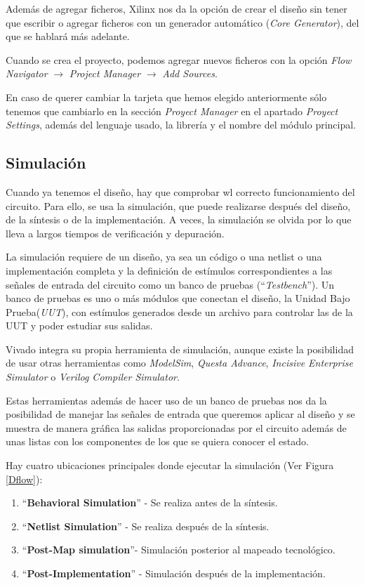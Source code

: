 Además de agregar ficheros, Xilinx nos da la opción de crear el diseño sin tener que escribir o agregar ficheros con un generador automático 
(\textit{Core Generator}), del que se hablará más adelante.

Cuando se crea el proyecto, podemos agregar nuevos ficheros con la opción \textit{Flow Navigator} $\rightarrow$ \textit{Project Manager} 
$\rightarrow$ \textit{Add Sources}.

En caso de querer cambiar la tarjeta que hemos elegido anteriormente sólo tenemos que cambiarlo en la sección \textit{Proyect Manager} en el 
apartado \textit{Proyect Settings}, además del lenguaje usado, la librería y el nombre del módulo principal.

\subsection{Simulación}

Cuando ya tenemos el diseño, hay que comprobar wl correcto funcionamiento del circuito. Para ello, se usa la simulación, que puede realizarse después del 
diseño, de la síntesis o de la implementación. A veces, la simulación se olvida por lo que lleva a largos tiempos de verificación y depuración. 

La simulación requiere de un diseño, ya sea un código o una netlist o una implementación completa y la definición de estímulos correspondientes a las 
señales de entrada del circuito como un banco de pruebas (``\textit{Testbench}''). Un banco de pruebas es uno o más módulos que conectan el diseño, 
la Unidad Bajo Prueba(\textit{UUT}), con estímulos generados desde un archivo para controlar las de la UUT y poder estudiar sus salidas.

Vivado integra su propia herramienta de simulación, aunque existe la posibilidad de usar otras herramientas como \textit{ModelSim}, \textit{Questa Advance}, 
\textit{Incisive Enterprise Simulator} o \textit{Verilog Compiler Simulator}.

Estas herramientas además de hacer uso de un banco de pruebas nos da la posibilidad de manejar las señales de entrada que queremos aplicar 
al diseño y se muestra de manera gráfica las salidas proporcionadas por el circuito además de unas listas con los componentes de los que se 
quiera conocer el estado.

\renewcommand{\theenumi}{\Alph{enumi}}

Hay cuatro ubicaciones principales donde ejecutar la simulación (Ver Figura \ref{Dflow}):
\begin{enumerate}
    \item ``\textbf{Behavioral Simulation}'' - Se realiza antes de la síntesis.
    \item ``\textbf{Netlist Simulation}'' - Se realiza después de la síntesis.
    \item ``\textbf{Post-Map simulation}''- Simulación posterior al mapeado tecnológico.
    \item ``\textbf{Post-Implementation}'' - Simulación después de la implementación.
\end{enumerate}

